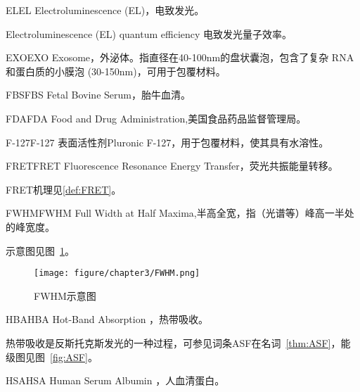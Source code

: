 \documentclass[cn,11pt,chinese]{elegantbook}
\begin{document}
\begin{theorem}{EL}{EL} 
 Electroluminescence (EL)，电致发光。 

 Electroluminescence (EL) quantum efficiency  电致发光量子效率。
\end{theorem}

\begin{theorem}{EXO}{EXO} 
  Exosome，外泌体。指直径在40-100nm的盘状囊泡，包含了复杂 RNA 和蛋白质的小膜泡 (30-150nm)，可用于包覆材料。
\end{theorem}

\begin{theorem}{FBS}{FBS} 
  Fetal Bovine Serum，胎牛血清。

\end{theorem}  

\begin{theorem}{FDA}{FDA} 
  Food and Drug Administration,美国食品药品监督管理局。
\end{theorem}

\begin{theorem}{F-127}{F-127} 
  表面活性剂Pluronic F-127，用于包覆材料，使其具有水溶性。
\end{theorem}

\begin{theorem}{FRET}{FRET} 
Fluorescence Resonance Energy Transfer，荧光共振能量转移。
\end{theorem}
\begin{note}
FRET机理见\vref{def:FRET}。
\end{note}

\begin{theorem}{FWHM}{FWHM} 
  Full Width at Half Maxima,半高全宽，指（光谱等）峰高一半处的峰宽度。
  
  示意图见图~\ref{fig:FWHM}。
  \end{theorem}

  \begin{figure}[h]
    \centering
    \texttt{[image: figure/chapter3/FWHM.png]}
    \caption{FWHM示意图}
    \label{fig:FWHM}
  \end{figure}
  
\begin{theorem}{HBA}{HBA} 
  Hot-Band Absorption ，热带吸收。

  热带吸收是反斯托克斯发光的一种过程，可参见词条ASF在名词~\vref{thm:ASF}，能级图见图~\vref{fig:ASF}。
  \end{theorem}


  
  \begin{theorem}{HSA}{HSA} 
  	Human Serum Albumin ，人血清蛋白。
    \end{theorem}
  
\end{document}
